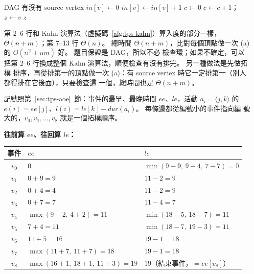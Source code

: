 \begin{pseudo}[label=alg:tps-px-source]{DAG 有沒有 source vertex}
        \State $\mathit{in}[v] \gets 0$
    \EndFor
            \State $\mathit{in}[v] \gets \mathit{in}[v] + 1$
        \EndFor
    \EndFor
    \State $c \gets 0$
            \State $c \gets c + 1$；$z \gets v$
        \EndIf
    \EndFor
        \State \Return $z$ 
    \EndIf
    \State \Return \NIL {}
\EndFunction
\end{pseudo}

第 2--6 行和 Kahn 演算法（虛擬碼~\ref{alg:tps-kahn}）算入度的部分一樣，$\Theta(n + m)$；第 7--13 行
$\Theta(n)$。 總時間 $\Theta(n + m)$，比對每個頂點做一次 (a) 的 $O(n^2 + nm)$ 好。 題目保證是 DAG，所以不必
檢查環；如果不確定，可以把第 2--6 行換成整個 Kahn 演算法，順便檢查有沒有排完。 另一種做法是先做拓樸
排序，再從排第一的頂點做一次 (a)：有 source vertex 時它一定排第一（別人都得排在它後面），只要檢查這
一個，總時間也是 $\Theta(n + m)$。

記號照第~\ref{sec:tps-aoe}~節：事件的最早、最晚時間 $\mathit{ee}$、$\mathit{le}$，活動 $a_i = \langle j, k
\rangle$ 的 $e(i) = \mathit{ee}[j]$、$l(i) = \mathit{le}[k] - \mathit{dur}(a_i)$。 每條邊都從編號小的事件指向編
號大的，$v_0, v_1, \ldots, v_8$ 就是一個拓樸順序。

\textbf{往前算 $\mathit{ee}$、往回算 $\mathit{le}$：}

\begin{center}
\small
\begin{tabular}{cll}
\toprule
事件 & $\mathit{ee}$ & $\mathit{le}$ \\
\midrule
$v_0$ & $0$ & $\min(9 - 9,\ 9 - 4,\ 7 - 7) = 0$ \\
$v_1$ & $0 + 9 = 9$ & $11 - 2 = 9$ \\
$v_2$ & $0 + 4 = 4$ & $11 - 2 = 9$ \\
$v_3$ & $0 + 7 = 7$ & $11 - 4 = 7$ \\
$v_4$ & $\max(9 + 2,\ 4 + 2) = 11$ & $\min(18 - 5,\ 18 - 7) = 11$ \\
$v_5$ & $7 + 4 = 11$ & $\min(18 - 7,\ 19 - 3) = 11$ \\
$v_6$ & $11 + 5 = 16$ & $19 - 1 = 18$ \\
$v_7$ & $\max(11 + 7,\ 11 + 7) = 18$ & $19 - 1 = 18$ \\
$v_8$ & $\max(16 + 1,\ 18 + 1,\ 11 + 3) = 19$ & $19$（結束事件，$= \mathit{ee}[v_8]$） \\
\bottomrule
\end{tabular}
\end{center}

